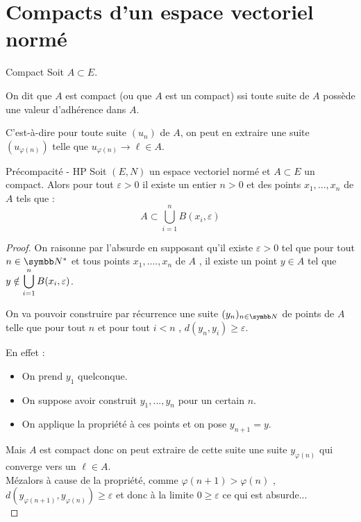 \section{Compacts d'un espace vectoriel normé}

\begin{definition}{Compact}{}
    Soit $A \subset E$. 

    On dit que $A$ est compact (ou que $A$ est un compact) ssi toute suite de $A$ possède une 
    valeur d'adhérence dans $A$.

    \avspace C'est-à-dire pour toute suite $(u_n)$ de $A$, on peut en extraire une suite 
    $(u_{\varphi(n)})$ telle que $u_{\varphi(n)} \to \ell \in A$.
\end{definition}

\begin{proposition}{Précompacité - HP}{}
Soit $(E,N)$ un espace vectoriel normé et $A\subset E$ un compact.
Alors pour tout $\varepsilon >0$ il existe un entier $n>0$ et des points $x_1,...,x_n$ de $A$ tels que :
\[A \subset \bigcup_{i=1}^n B(x_i,\varepsilon)\]
\end{proposition}

\begin{proof}
On raisonne par l'absurde en supposant qu'il existe $\varepsilon>0$ tel que pour tout $n \in \N^*$ et tous points $x_1,....,x_n$ de $A$ , il existe un point $y\in A$ tel que 
$\displaystyle y \notin \bigcup_{i=1}^n B(x_i,\varepsilon)$.

On va pouvoir construire par récurrence une suite $(y_n)_{n \in \N}$ de points de $A$ telle que pour tout $n$ et pour tout $i<n$ , $d(y_n,y_i)\geqslant \varepsilon$.

En effet :
\begin{itemize}
    \item On prend $y_1$ quelconque.
    \item On suppose avoir construit $y_1,...,y_n$ pour un certain $n$.
    \item On applique la propriété à ces points et on pose $y_{n+1}=y$.
\end{itemize}

Mais $A$ est compact donc on peut extraire de cette suite une suite $y_{\varphi(n)}$ qui converge vers un $\ell \in A$.\\
Mézalors à cause de la propriété, comme $\varphi(n+1)>\varphi(n)$ , $d(y_{\varphi(n+1)},y_{\varphi(n)})\geqslant \varepsilon$ et donc à la limite $0\geqslant \varepsilon$ ce qui est absurde...\\
\end{proof}

